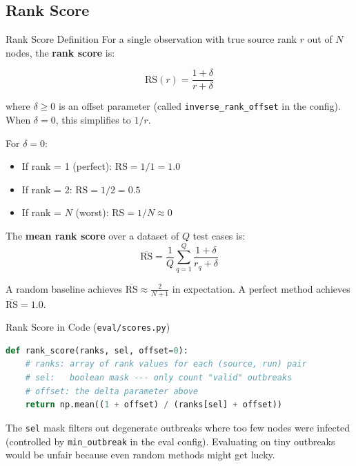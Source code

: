 \subsection{Rank Score}

\begin{mathbox}{Rank Score Definition}
For a single observation with true source rank $r$ out of $N$ nodes, the \textbf{rank score} is:

\[
\text{RS}(r) = \frac{1+\delta}{r+\delta}
\]

where $\delta \geq 0$ is an offset parameter (called \texttt{inverse\_rank\_offset} in the config). When $\delta = 0$, this simplifies to $1/r$.

For $\delta = 0$:
\begin{itemize}
    \item If rank = 1 (perfect): $\text{RS} = 1/1 = 1.0$
    \item If rank = 2: $\text{RS} = 1/2 = 0.5$
    \item If rank = $N$ (worst): $\text{RS} = 1/N \approx 0$
\end{itemize}

The \textbf{mean rank score} over a dataset of $Q$ test cases is:
\[
\overline{\text{RS}} = \frac{1}{Q} \sum_{q=1}^{Q} \frac{1+\delta}{r_q + \delta}
\]

A random baseline achieves $\overline{\text{RS}} \approx \frac{2}{N+1}$ in expectation. A perfect method achieves $\overline{\text{RS}} = 1.0$.
\end{mathbox}

\begin{codewalk}{Rank Score in Code (\texttt{eval/scores.py})}
\begin{lstlisting}[language=Python]
def rank_score(ranks, sel, offset=0):
    # ranks: array of rank values for each (source, run) pair
    # sel:   boolean mask --- only count "valid" outbreaks
    # offset: the delta parameter above
    return np.mean((1 + offset) / (ranks[sel] + offset))
\end{lstlisting}
The \texttt{sel} mask filters out degenerate outbreaks where too few nodes were infected (controlled by \texttt{min\_outbreak} in the eval config). Evaluating on tiny outbreaks would be unfair because even random methods might get lucky.
\end{codewalk}

